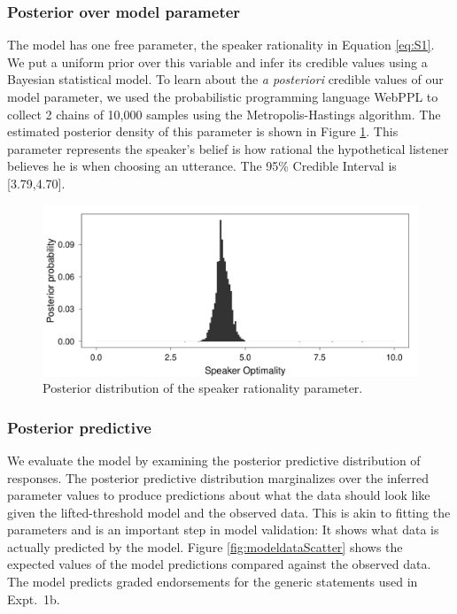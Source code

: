 \documentclass[10pt,letterpaper]{article}
\begin{document}
\subsubsection{Posterior over model parameter}

The model has one free parameter, the speaker rationality in Equation \ref{eq:S1}. 
We put a uniform prior over this variable and infer its credible values using a Bayesian statistical model. 
To learn about the \emph{a posteriori} credible values of our model parameter, we used the probabilistic programming language WebPPL \cite{dippl} to collect 2 chains of 10,000 samples using the Metropolis-Hastings algorithm. 
The estimated posterior density of this parameter is shown in Figure \ref{fig:rationality}. 
This parameter represents the speaker's belief is how rational the hypothetical listener believes he is when choosing an utterance. 
The 95\% Credible Interval is [3.79,4.70].

\begin{figure}
\centering
    \includegraphics[width=0.8\columnwidth]{posterior-rationality-truthJudge}
    \caption{Posterior distribution of the speaker rationality parameter.}
  \label{fig:rationality}
\end{figure}


\subsubsection{Posterior predictive}

We evaluate the model by examining the posterior predictive distribution of responses. The posterior predictive distribution marginalizes over the inferred parameter values to produce predictions about what the data should look like given the lifted-threshold model and the observed data. This is akin to fitting the parameters and is an important step in model validation: It shows what data is actually predicted by the model. 
Figure \ref{fig:modeldataScatter} shows the expected values of the model predictions compared against the observed data. 
The model predicts graded endorsements for the generic statements used in Expt.~1b. 
\end{document}
